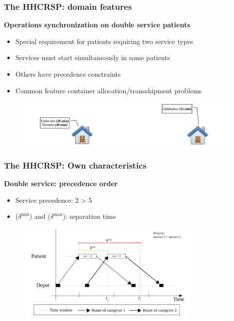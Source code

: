 \documentclass{beamer}
\begin{document}
\begin{frame}
   \frametitle{The HHCRSP: domain features}
   \textbf{Operations synchronization on double service patients}
   \begin{itemize}
      \item Special requirement for patients requiring two service types
      \item Services must start simultaneously in some patients
      \item Others have precedence constraints
      \item Common feature container allocation/transshipment problems \citep{drexl2012synchronization}
   \end{itemize}


   \begin{figure}[H]
      \includegraphics[width=1\textwidth,page=2]{fig/skilled}
   \end{figure}

\end{frame}

\begin{frame}
   \frametitle{The HHCRSP: Own characteristics}
   \textbf{Double service: precedence order}
   \begin{itemize}
      \item Service precedence: 2 > 5
      \item ($\delta^\mathrm{min}$) and ($\delta^\mathrm{max}$): separation time
   \end{itemize}

   \begin{figure}
      \centering
      \includegraphics[width=0.8\textwidth,page=1]{fig/sync-tsn2}
   \end{figure}
\end{frame}
\end{document}
